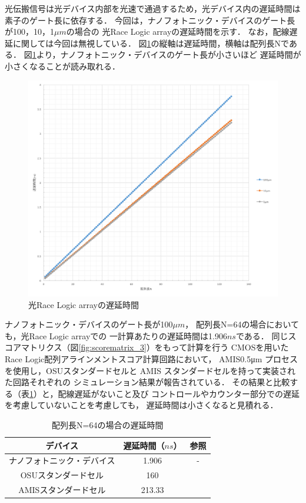 光伝搬信号は光デバイス内部を光速で通過するため，光デバイス内の遅延時間は素子のゲート長に依存する．
今回は，ナノフォトニック・デバイスのゲート長が100，10，1$\mu m$の場合の
光Race Logic arrayの遅延時間を示す．
なお，配線遅延に関しては今回は無視している．
図\ref{fig:nanolatency}の縦軸は遅延時間，横軸は配列長Nである．
図\ref{fig:nanolatency}より，ナノフォトニック・デバイスのゲート長が小さいほど
遅延時間が小さくなることが読み取れる．
\begin{figure}[t!]
\begin{center}
\includegraphics[keepaspectratio,scale=0.5]{fig/4/nanolatency.png}
\caption{光Race Logic arrayの遅延時間}
\label{fig:nanolatency}
\end{center}
\end{figure}

ナノフォトニック・デバイスのゲート長が100$\mu m$，
配列長N=64の場合においても，光Race Logic arrayでの
一計算あたりの遅延時間は1.906$ns$である．
同じスコアマトリクス（図\ref{fig:scorematrix_3}）をもって計算を行う
CMOSを用いたRace Logic配列アラインメントスコア計算回路において，
AMIS0.5μm プロセスを使用し，OSUスタンダードセルと
AMIS スタンダードセルを持って実装された回路それぞれの
シミュレーション結果が報告されている\cite {madhavan20174}．
その結果と比較する（表\ref{latency_64}）と，配線遅延がないこと及び
コントロールやカウンター部分での遅延を考慮していないことを考慮しても，
遅延時間は小さくなると見積れる．

\begin{table}[t!]
\begin{center}
\caption{配列長N=64の場合の遅延時間}
\begin{tabular}{|c|c|c|} \hline
デバイス&遅延時間（$ns$）&参照\\ \hline \hline
ナノフォトニック・デバイス&1.906&-\\ \hline
OSUスタンダードセル&160&\cite{madhavan2014race}\\ \hline
AMISスタンダードセル&213.33&\cite{madhavan2014race}\\ \hline
\end{tabular}
\label{latency_64}
\end{center}
\end{table}


